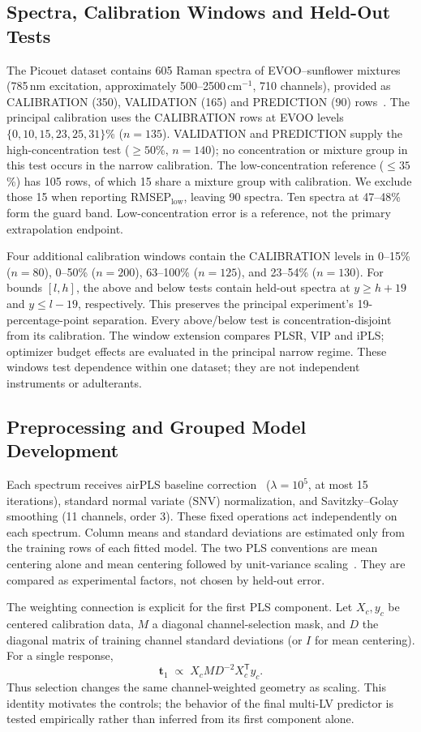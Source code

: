 \subsection{Spectra, Calibration Windows and Held-Out Tests}
The Picouet dataset contains 605 Raman spectra of EVOO--sunflower mixtures (785\,nm excitation, approximately 500--2500\,cm$^{-1}$, 710 channels), provided as CALIBRATION (350), VALIDATION (165) and PREDICTION (90) rows~\cite{picouet2023}. The principal calibration uses the CALIBRATION rows at EVOO levels $\{0,10,15,23,25,31\}$\% ($n=135$). VALIDATION and PREDICTION supply the high-concentration test ($\geq50$\%, $n=140$); no concentration or mixture group in this test occurs in the narrow calibration. The low-concentration reference ($\leq35$\%) has 105 rows, of which 15 share a mixture group with calibration. We exclude those 15 when reporting RMSEP$_{\mathrm{low}}$, leaving 90 spectra. Ten spectra at 47--48\% form the guard band. Low-concentration error is a reference, not the primary extrapolation endpoint.

Four additional calibration windows contain the CALIBRATION levels in 0--15\% ($n=80$), 0--50\% ($n=200$), 63--100\% ($n=125$), and 23--54\% ($n=130$). For bounds $[l,h]$, the above and below tests contain held-out spectra at $y\ge h+19$ and $y\le l-19$, respectively. This preserves the principal experiment's 19-percentage-point separation. Every above/below test is concentration-disjoint from its calibration. The window extension compares PLSR, VIP and iPLS; optimizer budget effects are evaluated in the principal narrow regime. These windows test dependence within one dataset; they are not independent instruments or adulterants.

\subsection{Preprocessing and Grouped Model Development}
Each spectrum receives airPLS baseline correction~\cite{zhang2010} ($\lambda=10^5$, at most 15 iterations), standard normal variate (SNV) normalization, and Savitzky--Golay smoothing (11 channels, order 3). These fixed operations act independently on each spectrum. Column means and standard deviations are estimated only from the training rows of each fitted model. The two PLS conventions are mean centering alone and mean centering followed by unit-variance scaling~\cite{wold2001}. They are compared as experimental factors, not chosen by held-out error.

The weighting connection is explicit for the first PLS component. Let $X_c,y_c$ be centered calibration data, $M$ a diagonal channel-selection mask, and $D$ the diagonal matrix of training channel standard deviations (or $I$ for mean centering). For a single response,
\begin{equation}
\mathbf t_1\;\propto\;X_c M D^{-2} X_c^{\mathsf T}y_c.
\label{eq:weighting}
\end{equation}
Thus selection changes the same channel-weighted geometry as scaling. This identity motivates the controls; the behavior of the final multi-LV predictor is tested empirically rather than inferred from its first component alone.


